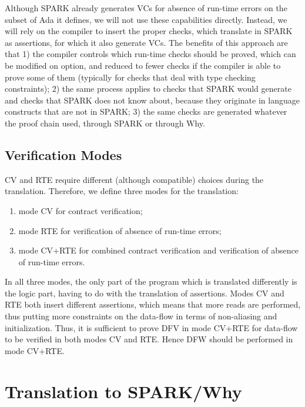 \documentclass{article}
\begin{document}
Although SPARK already generates VCs for absence of run-time errors on the
subset of Ada it defines, we will not use these capabilities directly. Instead,
we will rely on the compiler to insert the proper checks, which translate in
SPARK as assertions, for which it also generate VCs. The benefits of this
approach are that 1) the compiler controls which run-time checks should be
proved, which can be modified on option, and reduced to fewer checks if the
compiler is able to prove some of them (typically for checks that deal with
type checking constraints); 2) the same process applies to checks that SPARK
would generate and checks that SPARK does not know about, because they
originate in language constructs that are not in SPARK; 3) the same checks are
generated whatever the proof chain used, through SPARK or through Why.

\subsection{Verification Modes}

CV and RTE require different (although compatible) choices during the
translation.  Therefore, we define three modes for the translation:
\begin{enumerate}
\item mode CV for contract verification;
\item mode RTE for verification of absence of run-time errors;
\item mode CV+RTE for combined contract verification and verification of
  absence of run-time errors.
\end{enumerate}

In all three modes, the only part of the program which is translated
differently is the logic part, having to do with the translation of
assertions. Modes CV and RTE both insert different assertions, which means that
more reads are performed, thus putting more constraints on the data-flow in
terms of non-aliasing and initialization. Thus, it is sufficient to prove DFV
in mode CV+RTE for data-flow to be verified in both modes CV and RTE. Hence DFW
should be performed in mode CV+RTE.

\section{Translation to SPARK/Why}
\end{document}
